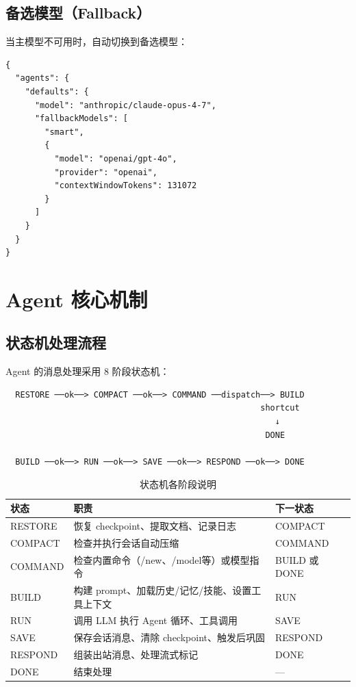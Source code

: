 \documentclass[12pt,a4paper,UTF8]{ctexart}
\begin{document}
\section{备选模型（Fallback）}

当主模型不可用时，自动切换到备选模型：

\begin{verbatim}
{
  "agents": {
    "defaults": {
      "model": "anthropic/claude-opus-4-7",
      "fallbackModels": [
        "smart",
        {
          "model": "openai/gpt-4o",
          "provider": "openai",
          "contextWindowTokens": 131072
        }
      ]
    }
  }
}
\end{verbatim}

\chapter{Agent 核心机制}

\section{状态机处理流程}

Agent 的消息处理采用 8 阶段状态机：

\begin{center}
\begin{minipage}{0.9\textwidth}
\begin{verbatim}
  RESTORE ──ok──> COMPACT ──ok──> COMMAND ──dispatch──> BUILD
                                                    shortcut
                                                       ↓
                                                     DONE

  BUILD ──ok──> RUN ──ok──> SAVE ──ok──> RESPOND ──ok──> DONE
\end{verbatim}
\end{minipage}
\end{center}

\begin{table}[H]
\centering
\begin{tabular}{L{2.5cm} L{10cm} L{2.5cm}}
\toprule
\textbf{状态} & \textbf{职责} & \textbf{下一状态} \\
\midrule
RESTORE & 恢复 checkpoint、提取文档、记录日志 & COMPACT \\
COMPACT & 检查并执行会话自动压缩 & COMMAND \\
COMMAND & 检查内置命令（/new、/model等）或模型指令 & BUILD 或 DONE \\
BUILD & 构建 prompt、加载历史/记忆/技能、设置工具上下文 & RUN \\
RUN & 调用 LLM 执行 Agent 循环、工具调用 & SAVE \\
SAVE & 保存会话消息、清除 checkpoint、触发后巩固 & RESPOND \\
RESPOND & 组装出站消息、处理流式标记 & DONE \\
DONE & 结束处理 & — \\
\bottomrule
\end{tabular}
\caption{状态机各阶段说明}
\end{table}
\end{document}
